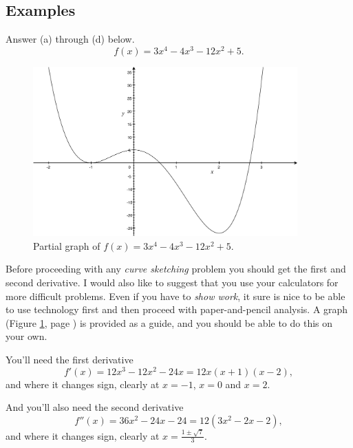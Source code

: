 \documentclass[12pt,addpoints, answers, fleqn]{exam}
\begin{document}
\subsection{Examples}
\begin{questions}
\question Answer (a) through (d) below.
\[
f\left(x\right) = 3x^4-4x^3-12x^2+5.
\]

\begin{figure}[htbp] %
   \centering
   \includegraphics[width=4in]{./graphics/graph29201.pdf} 
   \caption{Partial graph of $f\left(x\right) = 3x^4-4x^3-12x^2+5$.}
   \label{fig:graph29201}
\end{figure}
\begin{solution}
Before proceeding with any \emph{curve sketching} problem you should get the first and second derivative. I would also like to suggest that you use your calculators for more difficult problems. Even if you have to \emph{show work}, it sure is nice to be able to use technology first and then proceed with paper-and-pencil analysis. A graph (Figure \ref{fig:graph29201}, page \pageref{fig:graph29201}) is provided as a guide, and you should be able to do this on your own.

You'll need the first derivative
\[
f' \left(x\right) = 12x^3-12x^2-24x=12x\left(x+1\right)\left(x-2\right),
\]
and where it changes sign, clearly at $x=-1$, $x=0$ and $x=2$.

And you'll also need the second derivative
\[
f'' \left(x\right) = 36x^2-24x-24=12\left(3x^2-2x-2\right),
\]
and where it changes sign, clearly at $x=\displaystyle \frac{1 \pm \sqrt{7}}{3}$.
\end{solution}
\end{questions}
\end{document}
